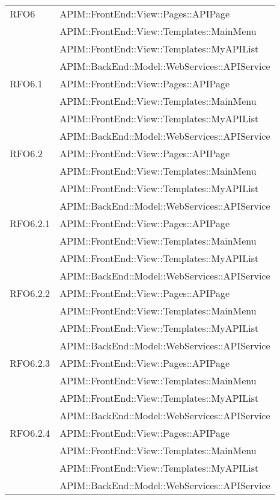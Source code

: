 \begin{longtable}{ p{4cm} | p{12cm} }
\hline RFO6
& APIM::FrontEnd::View::Pages::APIPage \\
& APIM::FrontEnd::View::Templates::MainMenu \\
& APIM::FrontEnd::View::Templates::MyAPIList \\
& APIM::BackEnd::Model::WebServices::APIService \\

\hline RFO6.1
& APIM::FrontEnd::View::Pages::APIPage \\
& APIM::FrontEnd::View::Templates::MainMenu \\
& APIM::FrontEnd::View::Templates::MyAPIList \\
& APIM::BackEnd::Model::WebServices::APIService \\
 
\hline RFO6.2
& APIM::FrontEnd::View::Pages::APIPage \\
& APIM::FrontEnd::View::Templates::MainMenu \\
& APIM::FrontEnd::View::Templates::MyAPIList \\
& APIM::BackEnd::Model::WebServices::APIService \\

\hline RFO6.2.1
& APIM::FrontEnd::View::Pages::APIPage \\
& APIM::FrontEnd::View::Templates::MainMenu \\
& APIM::FrontEnd::View::Templates::MyAPIList \\
& APIM::BackEnd::Model::WebServices::APIService \\

\hline RFO6.2.2
& APIM::FrontEnd::View::Pages::APIPage \\
& APIM::FrontEnd::View::Templates::MainMenu \\
& APIM::FrontEnd::View::Templates::MyAPIList \\
& APIM::BackEnd::Model::WebServices::APIService \\

\hline RFO6.2.3
& APIM::FrontEnd::View::Pages::APIPage \\
& APIM::FrontEnd::View::Templates::MainMenu \\
& APIM::FrontEnd::View::Templates::MyAPIList \\
& APIM::BackEnd::Model::WebServices::APIService \\

\hline RFO6.2.4
& APIM::FrontEnd::View::Pages::APIPage \\
& APIM::FrontEnd::View::Templates::MainMenu \\
& APIM::FrontEnd::View::Templates::MyAPIList \\
& APIM::BackEnd::Model::WebServices::APIService \\


\end{longtable}
